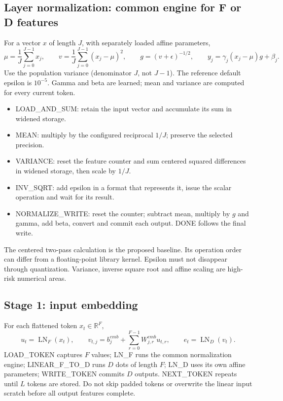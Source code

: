 \documentclass[11pt,a4paper]{article}
\begin{document}
\subsection{Layer normalization: common engine for F or D features}
For a vector $x$ of length $J$, with separately loaded affine parameters,
\[
\mu=\frac{1}{J}\sum_{j=0}^{J-1}x_j,\qquad
v=\frac{1}{J}\sum_{j=0}^{J-1}(x_j-\mu)^2,\qquad
g=(v+\epsilon)^{-1/2},\qquad
y_j=\gamma_j(x_j-\mu)g+\beta_j.
\]
Use the population variance (denominator $J$, not $J-1$). The reference default epsilon is $10^{-5}$. Gamma and beta are learned; mean and variance are computed for every current token.
\begin{itemize}
\item LOAD\_AND\_SUM: retain the input vector and accumulate its sum in widened storage.
\item MEAN: multiply by the configured reciprocal $1/J$; preserve the selected precision.
\item VARIANCE: reset the feature counter and sum centered squared differences in widened storage, then scale by $1/J$.
\item INV\_SQRT: add epsilon in a format that represents it, issue the scalar operation and wait for its result.
\item NORMALIZE\_WRITE: reset the counter; subtract mean, multiply by $g$ and gamma, add beta, convert and commit each output. DONE follows the final write.
\end{itemize}
The centered two-pass calculation is the proposed baseline. Its operation order can differ from a floating-point library kernel. Epsilon must not disappear through quantization. Variance, inverse square root and affine scaling are high-risk numerical areas.

\subsection{Stage 1: input embedding}
For each flattened token $x_t\in\mathbb{R}^{F}$,
\[
u_t=\operatorname{LN}_{F}(x_t),\qquad
v_{t,j}=b^{emb}_j+\sum_{r=0}^{F-1}W^{emb}_{j,r}u_{t,r},\qquad
e_t=\operatorname{LN}_{D}(v_t).
\]
LOAD\_TOKEN captures $F$ values; LN\_F runs the common normalization engine; LINEAR\_F\_TO\_D runs $D$ dots of length $F$; LN\_D uses its own affine parameters; WRITE\_TOKEN commits $D$ outputs. NEXT\_TOKEN repeats until $L$ tokens are stored. Do not skip padded tokens or overwrite the linear input scratch before all output features complete.
\end{document}
